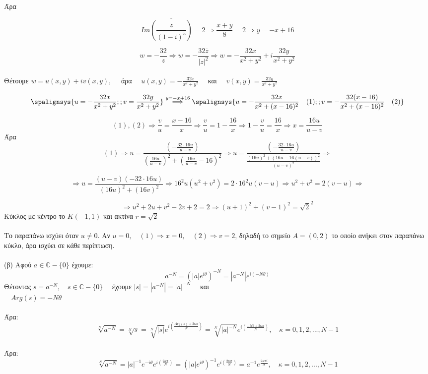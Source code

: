 \documentclass[12pt]{article}
\begin{document}
Άρα

$$ Im \overline{\left( \frac{z}{(1-i)^5} \right)}=2 \Rightarrow \frac{ x+y }{8}=2 \Rightarrow y=-x+16 $$

$$ w=-\frac{32}{z} \Rightarrow w=-\frac{32 \overline{z}}{|z|^2} \Rightarrow w=-\frac{32x}{x^2+y^2}+i\frac{32y}{x^2+y^2} $$
\\
Θέτουμε $w=u(x,y)+iv(x,y), \quad $ άρα $\quad u(x,y)=-\frac{32x}{x^2+y^2} \quad $  και $\quad v(x,y)= \frac{32y}{x^2+y^2}$

\[ 
\spalignsys{u=-\frac{32x}{x^2+y^2} ; ; v=\frac{32y}{x^2+y^2}}
\overset{y=-x+16}{\Longrightarrow}
\spalignsys{u=-\frac{32x}{x^2+(x-16)^2} \quad (1) ; ; v=-\frac{32(x-16)}{x^2+(x-16)^2}\quad(2)}
\] 

$$ (1),(2)\Rightarrow \frac{v}{u}= \frac{x-16}{x}\Rightarrow \frac{v}{u}= 1-\frac{16}{x} \Rightarrow 1-\frac{v}{u}= \frac{16}{x}\Rightarrow x= \frac{16u}{u-v}$$
Άρα
$$ (1)\Rightarrow u= \frac{\left(-\frac{32\cdot16u}{u-v} \right)}{\left( \frac{16u}{u-v}\right)^2+\left( \frac{16u}{u-v} -16 \right)^2}
\Rightarrow u= \frac{\left(-\frac{32\cdot16u}{u-v} \right)}{  \frac{(16u)^2+(16u-16(u-v))^2}{(u-v)^2}} \Rightarrow $$

$$ \Rightarrow u= \frac{(u-v)(-32\cdot16u)}{(16u)^2+(16v)^2} \Rightarrow 16^2u(u^2+v^2)= 2\cdot16^2u(v-u) \Rightarrow u^2+v^2= 2(v-u) \Rightarrow $$

$$ \Rightarrow u^2+2u +v^2-2v + 2 = 2 \Rightarrow (u+1)^2 + (v-1)^2 = \sqrt{2}^2 $$
Κύκλος με κέντρο το $Κ(-1,1)$ και ακτίνα $r=\sqrt{2}$ 
\\ \\
Το παραπάνω ισχύει όταν $u\neq 0$.
Αν $u=0,\quad (1)\Rightarrow x=0, \quad (2) \Rightarrow v=2$, δηλαδή το σημείο $Α=(0,2)$ το οποίο ανήκει στον παραπάνω κύκλο, άρα ισχύει σε κάθε περίπτωση.
\\ \\
(β)
Αφού $a\in\mathbb{C}-\{0\}$ έχουμε:
$$ a^{-N}=\left( |a|e^{i\theta} \right)^{-N}= |a^{-N}|e^{i(-N\theta)} $$
Θέτοντας $ s=a^{-N},\quad s\in\mathbb{C}-\{0\}\quad $ έχουμε $|s|=|a^{-N}|=|a|^{-N} \quad$ και 
\\  
$\quad Arg(s)=-N\theta $
\\ \\
Άρα:
$$ \sqrt[N]{a^{-N}}= \sqrt[N]{s}=\sqrt[N]{|s|}e^{i\left(\frac{Arg(s)+2\kappa\pi}{N}\right)}=\sqrt[N]{|a|^{-N}}e^{i\left(\frac{-N\theta+2\kappa\pi}{N}\right)}, \quad \kappa=0,1,2,...,N-1 $$
\\
Άρα:
$$ \sqrt[N]{a^{-N}}=|a|^{-1}e^{-i\theta}e^{i\left(\frac{2\kappa\pi}{N}\right)} =\left(|a|e^{i\theta}\right)^{-1}e^{i\left(\frac{2\kappa\pi}{N}\right)}=a^{-1}e^{\frac{2\kappa\pi i}{N}}, \quad \kappa=0,1,2,...,N-1 $$
\end{document}
